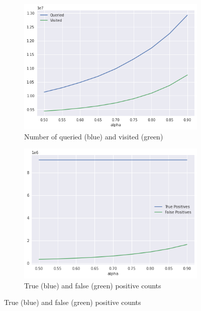 \begin{figure}[htbp]
    \centering
    \begin{subfigure}{.5\textwidth}
        \centering
        \includegraphics[width=\textwidth]{figures/e_coli-dbht-queried_and_found}
        \caption{Number of  queried (blue) and visited (green)}\label{fig:ecoli-art-dbht-traversal-queryfound}
    \end{subfigure}
    \begin{subfigure}{.5\textwidth}
        \centering
        \includegraphics[width=\textwidth]{figures/e_coli-dbht-true_and_false_positive_counts}
        \caption{True (blue) and false (green) positive counts}\label{fig:ecoli-art-dbht-traversal-positives}
    \end{subfigure}%

\end{figure}
